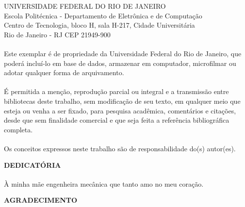 \pagebreak

      \vspace{0.5cm}

UNIVERSIDADE FEDERAL DO RIO DE JANEIRO \\
Escola Politécnica - Departamento de Eletrônica e de Computação \\
Centro de Tecnologia, bloco H, sala H-217, Cidade Universitária \\
Rio de Janeiro - RJ      CEP 21949-900\\
\vspace{0.5cm}
\paragraph{}Este exemplar é de propriedade da Universidade Federal do Rio de Janeiro, que poderá incluí-lo em base de dados, armazenar em computador, microfilmar ou adotar qualquer forma de arquivamento.
\paragraph{}É permitida a menção, reprodução parcial ou integral e a transmissão entre bibliotecas deste trabalho, sem modificação de seu texto, em qualquer meio que esteja ou venha a ser fixado, para pesquisa acadêmica, comentários e citações, desde que sem finalidade comercial e que seja feita a referência bibliográfica completa.
\paragraph{}Os conceitos expressos neste trabalho são de responsabilidade do(s) autor(es).


\pagebreak

\begin{center}
\textbf{DEDICATÓRIA}
\end{center}
      \vspace{0.5cm}

\paragraph{}\`A minha m\~ae engenheira mec\^anica que tanto amo no meu cora\c{c}\~ao.

\pagebreak


\begin{center}
\textbf{AGRADECIMENTO}
\end{center}
      \vspace{0.5cm}

